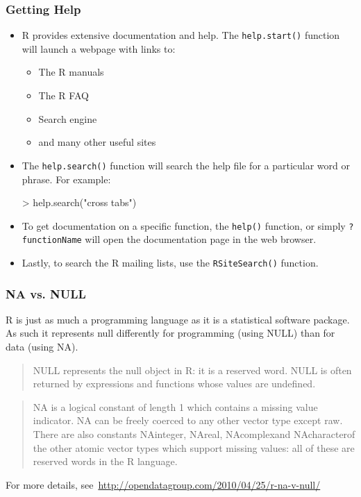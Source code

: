 \documentclass[10pt,slidestop,mathserif,c]{beamer}
\begin{document}
\begin{frame}
	\frametitle{Getting Help}
	\begin{itemize}
	\item<+-| alert@+>{ R provides extensive documentation and help. The \texttt{help.start()} function will launch a webpage with links to:
	\begin{itemize}
		\item The R manuals
		\item The R FAQ
		\item Search engine
		\item and many other useful sites
	\end{itemize} }
	\item<+-| alert@+>{ The \texttt{help.search()} function will search the help file for a particular word or phrase. For example:
\begin{Schunk}
\begin{Sinput}
> help.search("cross tabs")
\end{Sinput}
\end{Schunk}
}
	\item<+-| alert@+>{ To get documentation on a specific function, the \texttt{help()} function, or simply \texttt{?functionName} will open the documentation page in the web browser.}
	\item<+-| alert@+>{ Lastly, to search the R mailing lists, use the \texttt{RSiteSearch()} function.}
	\end{itemize}
\end{frame}

\begin{frame}[fragile]
	\frametitle{NA vs. NULL}
	R is just as much a programming language as it is a statistical software package. As such it represents null differently for programming (using NULL) than for data (using NA).
	\pause
	\begin{quote}NULL represents the null object in R: it is a reserved word. NULL is often returned by expressions and functions whose values are undefined.	\end{quote}	
	\pause
	\begin{quote}NA is a logical constant of length 1 which contains a missing value indicator. NA can be freely coerced to any other vector type except raw. There are also constants NA\textunderscore integer\textunderscore, NA\textunderscore real\textunderscore, NA\textunderscore complex\textunderscore and NA\textunderscore character\textunderscore of the other atomic vector types which support missing values: all of these are reserved words in the R language.\end{quote}
	For more details, see~\url{http://opendatagroup.com/2010/04/25/r-na-v-null/}
\end{frame}
\end{document}
